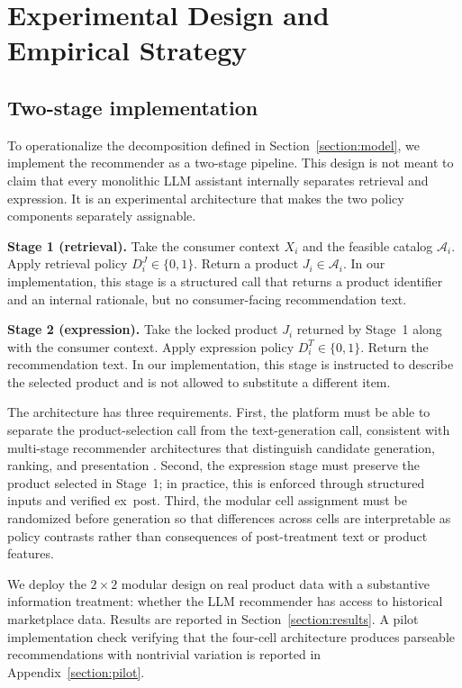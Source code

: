 \documentclass[11pt]{article}
\newcommand{\J}{J}
\newcommand{\X}{X}
\newcommand{\Qreg}{D^J}
\newcommand{\Rreg}{D^T}
\newcommand{\catalog}{\mathcal{A}}
\begin{document}
\section{Experimental Design and Empirical Strategy}\label{section:empirics}

\subsection{Two-stage implementation}\label{section:design}

To operationalize the decomposition defined in Section~\ref{section:model}, we implement the recommender as a two-stage pipeline. This design is not meant to claim that every monolithic LLM assistant internally separates retrieval and expression. It is an experimental architecture that makes the two policy components separately assignable.

\textbf{Stage 1 (retrieval).} Take the consumer context $\X_i$ and the feasible catalog $\catalog_i$. Apply retrieval policy $\Qreg_i \in \{0, 1\}$. Return a product $\J_i \in \catalog_i$. In our implementation, this stage is a structured call that returns a product identifier and an internal rationale, but no consumer-facing recommendation text.

\textbf{Stage 2 (expression).} Take the locked product $\J_i$ returned by Stage~1 along with the consumer context. Apply expression policy $\Rreg_i \in \{0, 1\}$. Return the recommendation text. In our implementation, this stage is instructed to describe the selected product and is not allowed to substitute a different item.

The architecture has three requirements. First, the platform must be able to separate the product-selection call from the text-generation call, consistent with multi-stage recommender architectures that distinguish candidate generation, ranking, and presentation \citep{ma2020off}. Second, the expression stage must preserve the product selected in Stage~1; in practice, this is enforced through structured inputs and verified ex~post. Third, the modular cell assignment must be randomized before generation so that differences across cells are interpretable as policy contrasts rather than consequences of post-treatment text or product features.

We deploy the $2 \times 2$ modular design on real product data with a substantive information treatment: whether the LLM recommender has access to historical marketplace data. Results are reported in Section~\ref{section:results}. A pilot implementation check verifying that the four-cell architecture produces parseable recommendations with nontrivial variation is reported in Appendix~\ref{section:pilot}.
\end{document}
